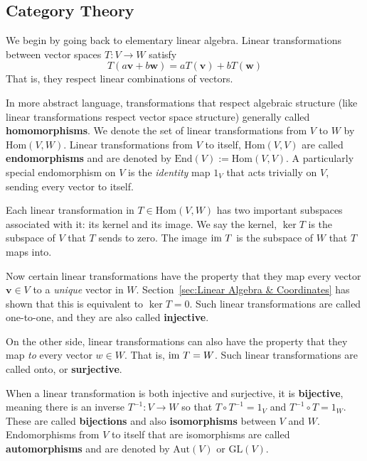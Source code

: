 \begin{appendices}
\chapter{Category Theory}

	We begin by going back to elementary linear algebra. Linear transformations between vector spaces $T: V \rightarrow W$ satisfy 
	\begin{equation}
		T(a \mathbf v + b \mathbf w) = a T(\mathbf v) + b T(\mathbf w)
	\end{equation}
	That is, they respect linear combinations of vectors.

	In more abstract language, transformations that respect algebraic structure (like linear transformations respect vector space structure) generally called \textbf{homomorphisms}. We denote the set of linear transformations from $V$ to $W$ by $\text{Hom}(V,W)$. Linear transformations from $V$ to itself, $\text{Hom}(V,V)$ are called \textbf{endomorphisms} and are denoted by $\text{End}(V):= \text{Hom}(V,V)$. A particularly special endomorphism on $V$ is the \emph{identity} map $1_V$ that acts trivially on $V$, sending every vector to itself.
	
	
	Each linear transformation in $T \in \text{Hom}(V,W)$ has two important subspaces associated with it: its kernel and its image. We say the kernel, $\ker T$ is the subspace of $V$ that $T$ sends to zero. The image $\text{im} ~ T$ is the subspace of $W$ that $T$ maps into.
		
	Now certain linear transformations have the property that they map every vector $\mathbf v \in V$ to a \emph{unique} vector in $W$. Section~\ref{sec:Linear Algebra & Coordinates} has shown that this is equivalent to $\ker T = 0$. Such linear transformations are called one-to-one, and they are also called \textbf{injective}. 
	
	On the other side, linear transformations can also have the property that they map \emph{to} every vector $w \in W$. That is, $\text{im}~T = W$. Such linear transformations are called onto, or \textbf{surjective}.
	
	When a linear transformation is both injective and surjective, it is \textbf{bijective}, meaning there is an inverse $T^{-1}:V \rightarrow W$ so that $T\circ T^{-1} = 1_V$ and $T^{-1} \circ T = 1_W$. These are called \textbf{bijections} and also \textbf{isomorphisms} between $V$ and $W$. Endomorphisms from $V$ to itself that are isomorphisms are called \textbf{automorphisms} and are denoted by $\text{Aut}(V)$ or $\mathrm{GL}(V)$. 


\end{appendices}
